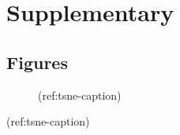 \documentclass[12pt,]{book}
\theoremstyle{definition}
\theoremstyle{definition}
\theoremstyle{definition}
\theoremstyle{remark}
\begin{document}
\newpage

\hypertarget{supplementary}{%
\section{Supplementary}\label{supplementary}}

\hypertarget{figures}{%
\subsection{Figures}\label{figures}}

\begin{figure}
\caption[Metagenes 2D landscape, parameters testing]{(ref:tsne-caption)}\label{fig:tsne}
\end{figure}

(ref:tsne-caption)
\end{document}
